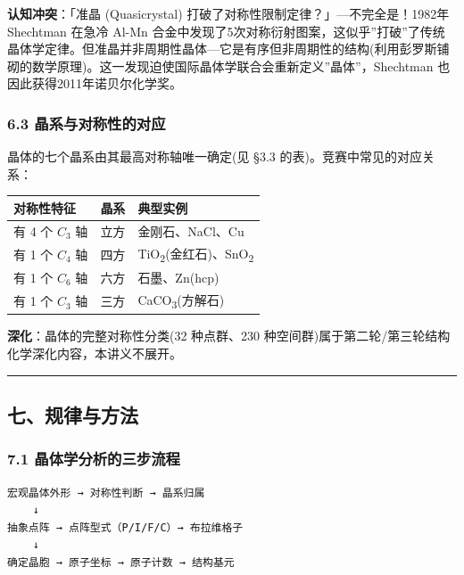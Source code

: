 \documentclass[a4paper,11pt]{ctexart}
\newcounter{none}
\newcommand{\箭}{\ensuremath{\rightarrow}}
\newcommand{\左箭}{\ensuremath{\leftarrow}}
\newcommand{\上箭}{\ensuremath{\uparrow}}
\newcommand{\下箭}{\ensuremath{\downarrow}}
\newcommand{\衡}{\ensuremath{\rightleftharpoons}}
\newcommand{\双箭}{\ensuremath{\leftrightarrow}}
\newcommand{\约等于}{\ensuremath{\approx}}
\newcommand{\小于等于}{\ensuremath{\leq}}
\newcommand{\大于等于}{\ensuremath{\geq}}
\newcommand{\不等于}{\ensuremath{\neq}}
\newcommand{\西格马}{\ensuremath{\sigma}}
\newcommand{\派}{\ensuremath{\pi}}
\begin{document}
\textbf{认知冲突}：「准晶 (Quasicrystal) 打破了对称性限制定律？」---不完全是！1982年 Shechtman 在急冷 Al-Mn 合金中发现了5次对称衍射图案，这似乎''打破''了传统晶体学定律。但准晶并非周期性晶体---它是有序但非周期性的结构(利用彭罗斯铺砌的数学原理)。这一发现迫使国际晶体学联合会重新定义''晶体''，Shechtman 也因此获得2011年诺贝尔化学奖。

\subsubsection{6.3 晶系与对称性的对应}\label{ux6676ux7cfbux4e0eux5bf9ux79f0ux6027ux7684ux5bf9ux5e94}

晶体的七个晶系由其最高对称轴唯一确定(见 §3.3 的表)。竞赛中常见的对应关系：

{\def\LTcaptype{none} %
\begin{longtable}[]{@{}lcl@{}}
\toprule\noalign{}
对称性特征 & 晶系 & 典型实例 \\
\midrule\noalign{}
\endhead
\bottomrule\noalign{}
\endlastfoot
有 4 个 \(C_3\) 轴 & 立方 & 金刚石、NaCl、Cu \\
有 1 个 \(C_4\) 轴 & 四方 & TiO\textsubscript{2}(金红石)、SnO\textsubscript{2} \\
有 1 个 \(C_6\) 轴 & 六方 & 石墨、Zn(hcp) \\
有 1 个 \(C_3\) 轴 & 三方 & CaCO\textsubscript{3}(方解石) \\
\end{longtable}
}

\textbf{深化}：晶体的完整对称性分类(32 种点群、230 种空间群)属于第二轮/第三轮结构化学深化内容，本讲义不展开。

\begin{center}\rule{0.5\linewidth}{0.5pt}\end{center}

\subsection{七、规律与方法}\label{ux4e03ux89c4ux5f8bux4e0eux65b9ux6cd5}

\subsubsection{7.1 晶体学分析的三步流程}\label{ux6676ux4f53ux5b66ux5206ux6790ux7684ux4e09ux6b65ux6d41ux7a0b}

\begin{verbatim}
宏观晶体外形 → 对称性判断 → 晶系归属
    ↓
抽象点阵 → 点阵型式（P/I/F/C）→ 布拉维格子
    ↓
确定晶胞 → 原子坐标 → 原子计数 → 结构基元
\end{verbatim}
\end{document}
